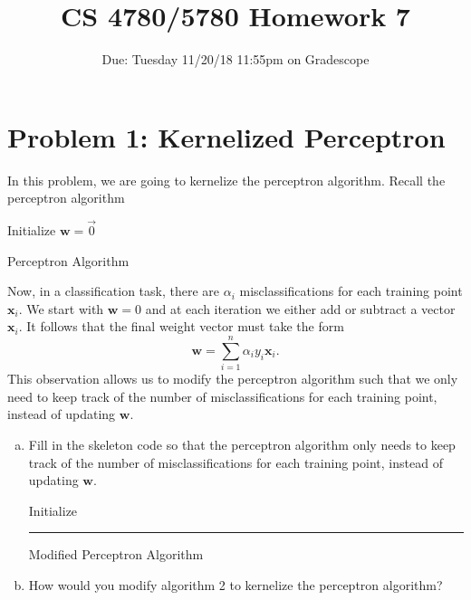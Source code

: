 \documentclass{article}
\title{CS 4780/5780 Homework 7\vspace{-10pt}}
\author{Due: Tuesday 11/20/18 11:55pm on Gradescope}
\date{}
\begin{document}
    \maketitle
	\section*{Problem 1: Kernelized Perceptron}
	In this problem, we are going to kernelize the perceptron algorithm. Recall the perceptron algorithm
	
	\begin{algorithm}[H]
		\SetAlgoLined
		
		Initialize $\mathbf{w} = \vec{0}$ \;
		\caption{Perceptron Algorithm}
	\end{algorithm}
	\noindent
	Now, in a classification task, there are $\alpha_i$ misclassifications for each training point $\mathbf{x}_i$. We start with $\mathbf{w}=0$ and at each iteration we either add or subtract a vector $\mathbf{x}_i$. It follows that the final weight vector must take the form 
	$$\mathbf{w} = \sum_{i=1}^{n} \alpha_i y_i \mathbf{x}_i.$$ 
	This observation allows us to modify the perceptron algorithm such that we only need to keep track of the number of misclassifications for each training point, instead of updating $\mathbf{w}$. 
	\begin{enumerate}[(a)]
		\item Fill in the skeleton code so that the perceptron algorithm only needs to keep track of the number of misclassifications for each training point, instead of updating $\mathbf{w}$.
		
		\begin{algorithm}[H]
			\SetAlgoLined
			
			Initialize \rule{7cm}{0.4pt} \;
			\caption{Modified Perceptron Algorithm}
		\end{algorithm}
		
		\item How would you modify algorithm 2 to kernelize the perceptron algorithm?
	\end{enumerate}
\end{document}
